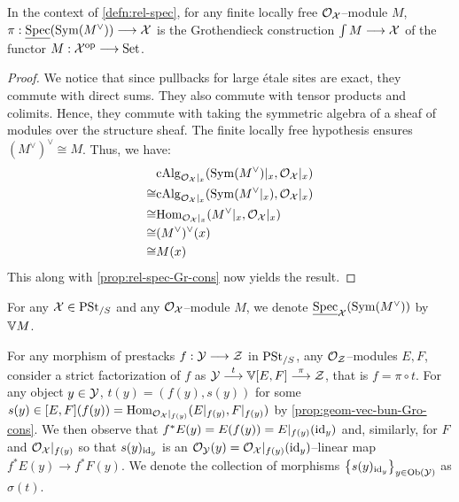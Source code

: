 \documentclass[11pt]{amsart}
\begin{document}
\begin{prop}\label{prop:geom-vec-bun-Gro-cons}
In the context of \cref{defn:rel-spec}, for any finite locally free
$\mathcal{O}_\mathcal{X}$--module $M$, $\pi : \ul\Spec(\Sym(M^\vee)) \to \mcX$ is the
Grothendieck construction $\int M \to \mcX$ of the functor
$M : \mcX^\op \to \Set$.
\end{prop}
\begin{proof}
We notice that since pullbacks for large \'etale sites are exact, they commute
with direct sums. They also commute with tensor products and colimits. Hence,
they commute with taking the symmetric algebra of a sheaf of modules over the
structure sheaf. The finite locally free hypothesis ensures
$(M^\vee)^\vee \cong M$. Thus, we have:
\begin{align*}
     & \mathrm{cAlg}_{\mathcal{O}_\mathcal{X}|_x}(\mathrm{Sym}(M^\vee)|_x, \mathcal{O}_\mathcal{X}|_x) \\
\cong& \mathrm{cAlg}_{\mathcal{O}_\mathcal{X}|_x}(\mathrm{Sym}(M^\vee|_x), \mathcal{O}_\mathcal{X}|_x) \\
\cong& \mathrm{Hom}_{\mathcal{O}_\mathcal{X}|_x}(M^\vee|_x, \mathcal{O}_\mathcal{X}|_x) \\
\cong& (M^\vee)^\vee(x) \\
\cong& M(x)
\end{align*}
This along with \cref{prop:rel-spec-Gr-cons} now yields the result.
\end{proof}

\begin{notn}
For any $\mathcal{X} \in \mathrm{PSt}_{/S}$ and any $\mathcal{O}_\mathcal{X}$--module $M$, we denote
$\underline{\mathrm{Spec}}_\mathcal{X}(\mathrm{Sym}(M^\vee))$ by $\mathbb{V} M$.
\end{notn}

\begin{cns}\label{cns:sec-to-morphism}
For any morphism of prestacks $f : \mcY \to \mcZ$ in $\mathrm{PSt}_{/S}$, any
$\mathcal{O}_\mathcal{Z}$--modules $E, F$, consider
a strict factorization of $f$ as $\mcY \to[t] \bV[E, F] \to[\pi] \mcZ$, that is
$f = \pi \circ t$.
For any object $y \in \mathcal{Y}$,
$t(y) = (f(y), s(y))$ for some
$s(y) \in [E, F](f(y)) = \mathrm{Hom}_{\mathcal{O}_\mathcal{X}|_{f(y)}}(E|_{f(y)}, F|_{f(y)})$ by
\cref{prop:geom-vec-bun-Gro-cons}.
We then observe that $f^*E(y) = E(f(y)) = E|_{f(y)}(\mathrm{id}_y)$ and, similarly,
for $F$ and $\mathcal{O}_\mathcal{X}|_{f(y)}$ so that
$s(y)_{\mathrm{id}_y}$ is an $\mathcal{O}_\mathcal{Y}(y) = \mathcal{O}_\mathcal{X}|_{f(y)}(\mathrm{id}_y)$--linear map
$f^*E(y) \to f^*F(y)$.
We denote the collection of morphisms $\set{s(y)_{\id_y}}_{y \in \Ob{\mcY}}$
as $\sigma(t)$.
\end{cns}
\end{document}
